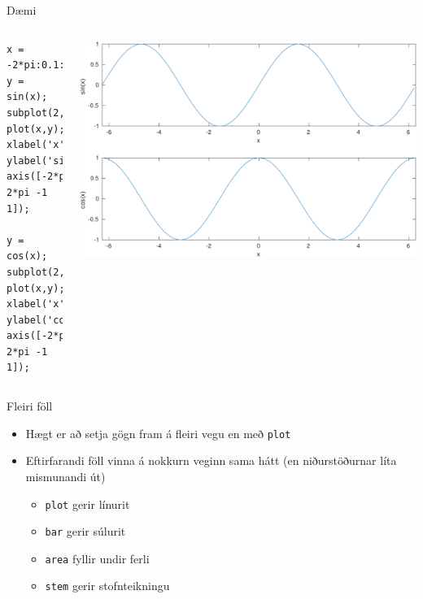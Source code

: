 \documentclass{beamer}
\begin{document}
\begin{frame}[fragile]{Dæmi}
\begin{columns}
\begin{verbatim}
x = -2*pi:0.1:2*pi;
y = sin(x);
subplot(2,1,1);
plot(x,y);
xlabel('x');
ylabel('sin(x)');
axis([-2*pi 2*pi -1 1]);

y = cos(x);
subplot(2,1,2);
plot(x,y);
xlabel('x');
ylabel('cos(x)');
axis([-2*pi 2*pi -1 1]);
\end{verbatim}
\includegraphics[width=\textwidth]{../Pics/subplot-example.pdf}
\end{columns}
\end{frame}

\begin{frame}{Fleiri föll}
\begin{itemize}
 \item Hægt er að setja gögn fram á fleiri vegu en með \texttt{plot}
 \item Eftirfarandi föll vinna á nokkurn veginn sama hátt (en niðurstöðurnar líta mismunandi út)
 \begin{itemize}
  \item \texttt{plot} gerir línurit
  \item \texttt{bar} gerir súlurit
  \item \texttt{area} fyllir undir ferli
  \item \texttt{stem} gerir stofnteikningu
 \end{itemize}
\end{itemize}
\end{frame}
\end{document}
